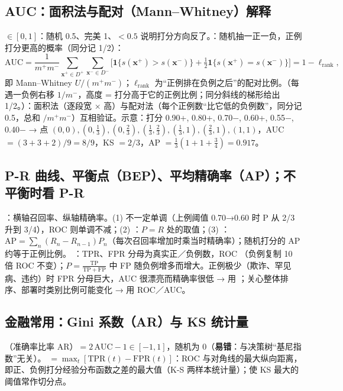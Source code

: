 \subsection{AUC：面积法与配对（Mann–Whitney）解释}
 $\in[0,1]$：随机 0.5、完美 1、$<0.5$ 说明打分方向反了。：随机抽一正一负，正例打分更高的概率（同分记 1/2）：
\[
\mathrm{AUC}=\frac1{m^+m^-}\sum_{\bm x^+\in D^+}\sum_{\bm x^-\in D^-}\Big[\mathbf 1\{s(\bm x^+)>s(\bm x^-)\}+\tfrac12\mathbf 1\{s(\bm x^+)=s(\bm x^-)\}\Big]=1-\ell_{\text{rank}},
\]
即 Mann–Whitney $U/(m^+m^-)$；$\ell_{\text{rank}}$ 为“正例排在负例之后”的配对比例。（每遇一负例右移 $1/m^-$，高度 = 打分高于它的正例比例；同分斜线的梯形给出 1/2。）：面积法（逐段宽 × 高）与配对法（每个正例数“比它低的负例数”，同分记 0.5，总和 $/m^+m^-$）互相验证。示意：打分 0.90+, 0.80+, 0.70$-$, 0.60+, 0.55$-$, 0.40$-$ → 点 $(0,0),(0,\frac13),(0,\frac23),(\frac13,\frac23),(\frac13,1),(\frac23,1),(1,1)$，AUC $=(3+3+2)/9=8/9$，KS $=2/3$，AP $=\frac13(1+1+\frac34)=0.917$。

\subsection{P-R 曲线、平衡点（BEP）、平均精确率（AP）；不平衡时看 P-R}
：横轴召回率、纵轴精确率。(1) 不一定单调（上例阈值 0.70→0.60 时 P 从 2/3 升到 3/4），ROC 则单调不减；(2) ：$P=R$ 处的取值；(3) ：$\mathrm{AP}=\sum_n(R_n-R_{n-1})P_n$（每次召回率增加时乘当时精确率）；随机打分的 AP 约等于正例比例。
：TPR、FPR 分母为真实正／负例数，ROC （负例复制 10 倍 ROC 不变）；$P=\frac{\mathrm{TP}}{\mathrm{TP}+\mathrm{FP}}$ 中 FP 随负例增多而增大。正例极少（欺诈、罕见病、违约）时 FPR 分母巨大，AUC 很漂亮而精确率很低 → 用 ；关心整体排序、部署时类别比例可能变化 → 用 ROC／AUC。

\subsection{金融常用：Gini 系数（AR）与 KS 统计量}
（准确率比率 AR）$=2\,\mathrm{AUC}-1\in[-1,1]$，随机为 0（\textbf{易错}：与决策树“基尼指数”无关）。 $=\max_t[\mathrm{TPR}(t)-\mathrm{FPR}(t)]$：ROC 与对角线的最大纵向距离，即正、负例打分经验分布函数之差的最大值（K-S 两样本统计量）；使 KS 最大的阈值常作切分点。

